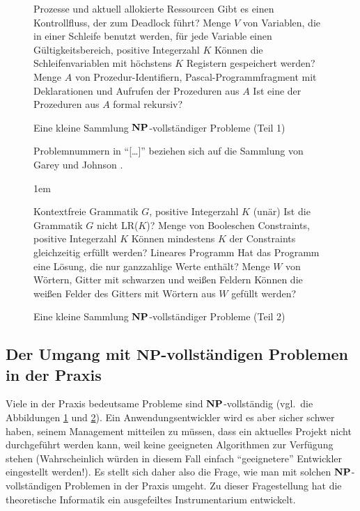 \begin{figure}
\begin{center}
\begin{multicols}{2}
{Prozesse und aktuell allokierte Ressourcen}
{Gibt es einen Kontrollfluss, der zum Deadlock führt?}
%
{Menge $V$ von Variablen, die in einer Schleife benutzt werden, für jede
Variable einen Gültigkeitsbereich, positive Integerzahl $K$}
{Können die Schleifenvariablen mit höch\-stens $K$ Registern gespeichert werden?}
%
{Menge $A$ von Prozedur-Identifiern, Pascal-Programm\-fragment mit
Deklarationen und Aufrufen der Prozeduren aus $A$}
{Ist eine der Prozeduren aus $A$ formal rekursiv?}
\end{multicols}
\end{center}
\caption{Eine kleine Sammlung $\mathbf{N}\mathbf{P}$-vollständiger Probleme (Teil 1)}
\label{NPVollProbs1}
\end{figure}

\begin{figure}
\begin{center}
\footnotesize
Problemnummern in "`[\dots]"' beziehen sich auf die Sammlung von
Garey und Johnson \cite{GaJo79}.

\columnsep1em
\begin{multicols}{2}
{Kontextfreie Grammatik $G$, positive Integerzahl $K$ (unär)}
{Ist die Grammatik $G$ nicht LR($K$)?}
%
{Menge von Booleschen Constraints, positive Integerzahl $K$}
{Können mindestens $K$ der Constraints gleichzeitig erfüllt werden?}
%
{Lineares Programm}
{Hat das Programm eine Lösung, die nur ganzzahlige Werte enthält?}
%
%
{Menge $W$ von Wörtern, Gitter mit schwarzen und weißen Feldern}
{Können die weißen Felder des Gitters mit Wörtern aus $W$ gefüllt werden?}%
\end{multicols}
\caption{Eine kleine Sammlung $\mathbf{N}\mathbf{P}$-vollständiger Probleme (Teil 2)}
\label{NPVollProbs2}
\end{center}
\end{figure}

\subsection{Der Umgang mit $\mathbf{NP}$-vollständigen Problemen in der Praxis}

Viele in der Praxis bedeutsame Probleme sind $\mathbf{N}\mathbf{P}$-vollständig
(vgl.~die Abbildungen \ref{NPVollProbs1} und \ref{NPVollProbs2}). Ein
Anwendungsentwickler wird es aber sicher schwer haben, seinem
Management mitteilen zu müssen, dass ein aktuelles Projekt nicht
durchgeführt werden kann, weil keine geeigneten Algorithmen zur
Verfügung stehen (Wahrscheinlich würden in diesem Fall einfach
"`geeignetere"' Entwickler eingestellt werden!). Es stellt sich daher
also die Frage, wie man mit solchen $\mathbf{N}\mathbf{P}$-vollständigen Problemen in
der Praxis umgeht. Zu dieser Fragestellung hat die theoretische
Informatik ein ausgefeiltes Instrumentarium entwickelt.

